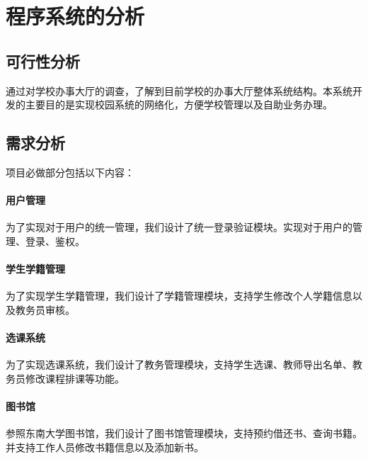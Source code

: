 \documentclass{article}
\begin{document}


\section{程序系统的分析}

\subsection{可行性分析}

通过对学校办事大厅的调查，了解到目前学校的办事大厅整体系统结构。本系统开发的主要目的是实现校园系统的网络化，方便学校管理以及自助业务办理。

\subsection{需求分析}

项目必做部分包括以下内容：

\paragraph{用户管理}
为了实现对于用户的统一管理，我们设计了统一登录验证模块。实现对于用户的管理、登录、鉴权。

\paragraph{学生学籍管理}
为了实现学生学籍管理，我们设计了学籍管理模块，支持学生修改个人学籍信息以及教务员审核。

\paragraph{选课系统}
为了实现选课系统，我们设计了教务管理模块，支持学生选课、教师导出名单、教务员修改课程排课等功能。

\paragraph{图书馆}
参照东南大学图书馆，我们设计了图书馆管理模块，支持预约借还书、查询书籍。并支持工作人员修改书籍信息以及添加新书。
\end{document}
